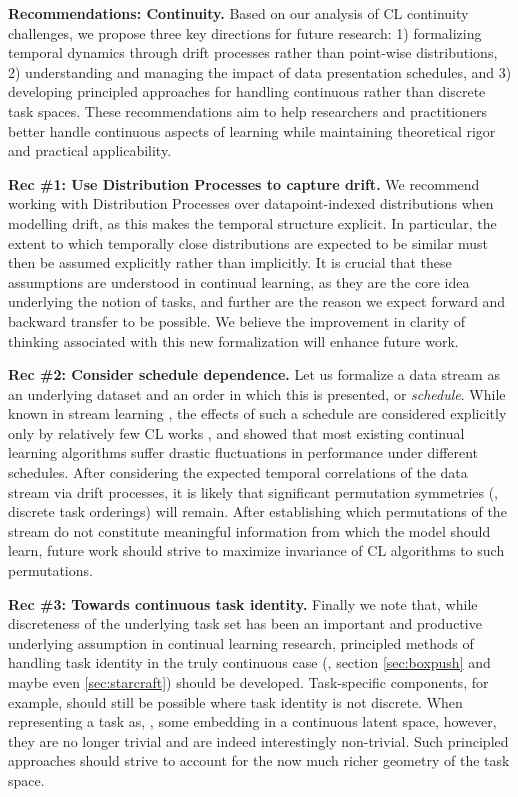 \begin{tcolorbox}[colback=blue!10,colframe=blue!50,boxsep=-1pt]
\textbf{Recommendations: Continuity.}
Based on our analysis of CL continuity challenges, we propose three key directions for future research:
1) formalizing temporal dynamics through drift processes rather than point-wise distributions, 2) understanding
and managing the impact of data presentation schedules, and 3) developing principled approaches for handling
continuous rather than discrete task spaces.
These recommendations aim to help researchers and practitioners better handle continuous aspects of learning while maintaining theoretical rigor and practical applicability.
\end{tcolorbox}

\textbf{Rec \#1: Use Distribution Processes to capture drift.}
We recommend working with Distribution Processes over datapoint-indexed distributions when modelling drift, as this makes the temporal structure explicit.
In particular, the extent to which temporally close distributions are expected to be similar must then be assumed explicitly rather than implicitly.
It is crucial that these assumptions are understood in continual learning, as they are the core idea underlying the notion of tasks,
and further are the reason we expect forward and backward transfer to be possible.
We believe the improvement in clarity of thinking associated with this new formalization will enhance future work.

\textbf{Rec \#2: Consider schedule dependence.}
Let us formalize a data stream as
an underlying dataset and an order in which this is presented, or \textit{schedule}.
While known in stream learning \cite{gama2014survey},
the effects of such a schedule are considered explicitly only by relatively few CL works \cite{Yoon2020Scalable, wang2022schedule},
and \citet{wang2022schedule} showed that most existing continual learning algorithms suffer drastic fluctuations in performance under different schedules.
After considering the expected temporal correlations of the data stream via drift processes, it is likely that significant permutation symmetries (\eg, discrete task orderings) will remain.
After establishing which permutations of the stream do not constitute meaningful information from which the model should learn,
future work should strive to maximize invariance of CL algorithms to such permutations.

\textbf{Rec \#3: Towards continuous task identity.}
Finally we note that, while discreteness of the underlying task set has been an important and productive underlying assumption in continual learning research, principled methods of handling task identity in the truly continuous case (\eg, section \ref{sec:boxpush} and maybe even \ref{sec:starcraft}) should be developed.
Task-specific components, for example, should still be possible where task identity is not discrete.
When representing a task as, \eg, some embedding in a continuous latent space, however, they are no longer trivial and are indeed interestingly non-trivial.
Such principled approaches should strive to account for the now much richer geometry of the task space.


